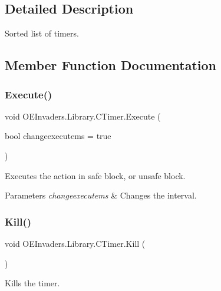 \subsection{Detailed Description}
Sorted list of timers. 



\subsection{Member Function Documentation}
\mbox{\label{class_o_e_invaders_1_1_library_1_1_c_timer_aa4c5642c3ca0c61bea0491b6b0ad9856}} 
\subsubsection{\texorpdfstring{Execute()}{Execute()}}
{\footnotesize\ttfamily void O\+E\+Invaders.\+Library.\+C\+Timer.\+Execute (\begin{DoxyParamCaption}\item[{bool}]{changeexecutems = {\ttfamily true} }\end{DoxyParamCaption})}



Executes the action in safe block, or unsafe block. 


\begin{DoxyParams}{Parameters}
{\em changeexecutems} & Changes the interval.\\
\hline
\end{DoxyParams}
\mbox{\label{class_o_e_invaders_1_1_library_1_1_c_timer_a4a16830ba5bca4b347d77b292a1fa953}} 
\subsubsection{\texorpdfstring{Kill()}{Kill()}}
{\footnotesize\ttfamily void O\+E\+Invaders.\+Library.\+C\+Timer.\+Kill (\begin{DoxyParamCaption}{ }\end{DoxyParamCaption})}



Kills the timer. 

